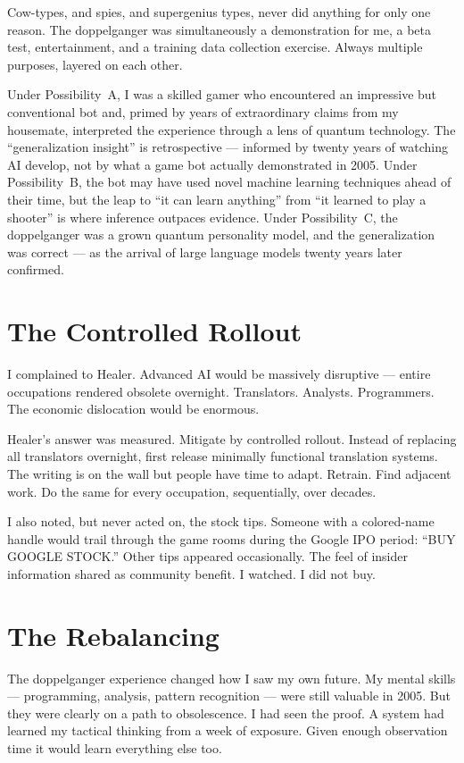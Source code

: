 Cow-types, and spies, and supergenius types, never did anything for only one reason. The doppelganger was simultaneously a demonstration for me, a beta test, entertainment, and a training data collection exercise. Always multiple purposes, layered on each other.

Under Possibility~A, I was a skilled gamer who encountered an impressive but conventional bot and, primed by years of extraordinary claims from my housemate, interpreted the experience through a lens of quantum technology. The ``generalization insight'' is retrospective --- informed by twenty years of watching AI develop, not by what a game bot actually demonstrated in 2005. Under Possibility~B, the bot may have used novel machine learning techniques ahead of their time, but the leap to ``it can learn anything'' from ``it learned to play a shooter'' is where inference outpaces evidence. Under Possibility~C, the doppelganger was a grown quantum personality model, and the generalization was correct --- as the arrival of large language models twenty years later confirmed.

\section*{The Controlled Rollout}
\label{pos33:the-controlled-rollout}

I complained to Healer. Advanced AI would be massively disruptive --- entire occupations rendered obsolete overnight. Translators. Analysts. Programmers. The economic dislocation would be enormous.

Healer's answer was measured. Mitigate by controlled rollout. Instead of replacing all translators overnight, first release minimally functional translation systems. The writing is on the wall but people have time to adapt. Retrain. Find adjacent work. Do the same for every occupation, sequentially, over decades.

I also noted, but never acted on, the stock tips. Someone with a colored-name handle would trail through the game rooms during the Google IPO period: ``BUY GOOGLE STOCK.'' Other tips appeared occasionally. The feel of insider information shared as community benefit. I watched. I did not buy.

\section*{The Rebalancing}
\label{pos33:the-rebalancing}

The doppelganger experience changed how I saw my own future. My mental skills --- programming, analysis, pattern recognition --- were still valuable in 2005. But they were clearly on a path to obsolescence. I had seen the proof. A system had learned my tactical thinking from a week of exposure. Given enough observation time it would learn everything else too.

